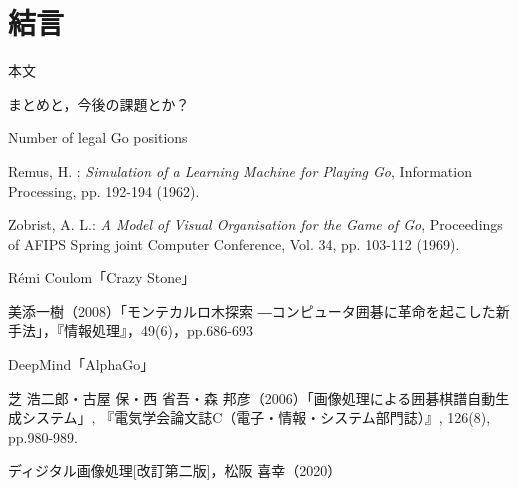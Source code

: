\documentclass[openright]{nitocs}
\numberwithin{equation}{section}
\begin{document}
    \section{結言}\label{sec:Item} %
        本文

        まとめと，今後の課題とか？

            
            

    \begin{thebibliography}{10} %


        Number of legal Go positions

        Remus, H. : 
        {\it Simulation of a Learning Machine for Playing Go}, 
        Information Processing, 
        pp. 192-194 (1962). 

        Zobrist, A. L.: 
        {\it A Model of Visual Organisation for the Game of Go}, 
        Proceedings of AFIPS Spring joint Computer Conference, 
        Vol. 34, pp. 103-112 (1969). 

        Rémi Coulom「Crazy Stone」

        美添一樹（2008）「モンテカルロ木探索 ―コンピュータ囲碁に革命を起こした新手法」，『情報処理』，49(6)，pp.686-693

        DeepMind「AlphaGo」

        芝 浩二郎・古屋 保・西 省吾・森 邦彦（2006）「画像処理による囲碁棋譜自動生成システム」,  『電気学会論文誌C（電子・情報・システム部門誌）』, 126(8), pp.980-989.

        ディジタル画像処理[改訂第二版]，松阪 喜幸（2020）



\end{thebibliography}
\end{document}

